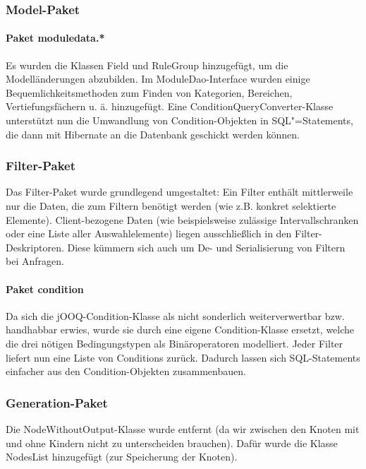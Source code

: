 \subsubsection{Model-Paket}

\paragraph{Paket moduledata.*} Es wurden die Klassen Field und RuleGroup hinzugefügt, um die Modelländerungen abzubilden. Im ModuleDao-Interface wurden einige Bequemlichkeitsmethoden zum Finden von Kategorien, Bereichen, Vertiefungsfächern u. ä. hinzugefügt. Eine ConditionQueryConverter-Klasse unterstützt nun die Umwandlung von Condition-Objekten in SQL"=Statements, die dann mit Hibernate an die Datenbank geschickt werden können.



\subsubsection{Filter-Paket}

Das Filter-Paket wurde grundlegend umgestaltet: Ein Filter enthält mittlerweile nur die Daten, die zum Filtern benötigt werden (wie z.B. konkret selektierte Elemente). Client-bezogene Daten (wie beispielsweise zulässige Intervallschranken oder eine Liste aller Auswahlelemente) liegen ausschließlich in den Filter-Deskriptoren. Diese kümmern sich auch um De- und Serialisierung von Filtern bei Anfragen.

\paragraph{Paket condition} Da sich die jOOQ-Condition-Klasse als nicht sonderlich weiterverwertbar bzw. handhabbar erwies, wurde sie durch eine eigene Condition-Klasse ersetzt, welche die drei nötigen Bedingungstypen als Binäroperatoren modelliert. Jeder Filter liefert nun eine Liste von Conditions zurück. Dadurch lassen sich SQL-Statements einfacher aus den Condition-Objekten zusammenbauen.


\subsubsection{Generation-Paket}

Die NodeWithoutOutput-Klasse wurde entfernt (da wir zwischen den Knoten mit und ohne Kindern nicht zu unterscheiden brauchen). 
Dafür wurde die Klasse NodesList hinzugefügt (zur Speicherung der Knoten).


